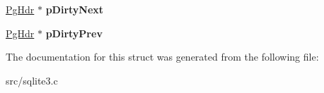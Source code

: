\begin{DoxyCompactItemize}
\item 
\hypertarget{struct_pg_hdr_a61b56eb694ce445799963f7eb912e367}{\hyperlink{struct_pg_hdr}{Pg\-Hdr} $\ast$ {\bfseries p\-Dirty\-Next}}\label{struct_pg_hdr_a61b56eb694ce445799963f7eb912e367}

\item 
\hypertarget{struct_pg_hdr_a8392b45bb05d88c734020beb912304dc}{\hyperlink{struct_pg_hdr}{Pg\-Hdr} $\ast$ {\bfseries p\-Dirty\-Prev}}\label{struct_pg_hdr_a8392b45bb05d88c734020beb912304dc}

\end{DoxyCompactItemize}


The documentation for this struct was generated from the following file\-:\begin{DoxyCompactItemize}
\item 
src/sqlite3.\-c\end{DoxyCompactItemize}
